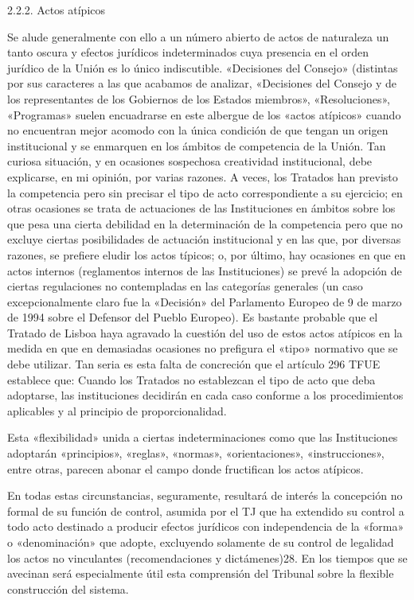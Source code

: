 \documentclass[10pt,a4paper]{article}
\begin{document}
2.2.2. Actos atípicos

Se alude generalmente con ello a un número abierto de actos de naturaleza un tanto oscura y efectos jurídicos indeterminados cuya presencia en el orden jurídico de la Unión es lo único indiscutible. «Decisiones del Consejo» (distintas por sus caracteres a las que acabamos de analizar, «Decisiones del Consejo y de los representantes de los Gobiernos de los Estados miembros», «Resoluciones», «Programas» suelen encuadrarse en este albergue de los «actos atípicos» cuando no encuentran mejor acomodo con la única condición de que tengan un origen institucional y se enmarquen en los ámbitos de competencia de la Unión. Tan curiosa situación, y en ocasiones sospechosa creatividad institucional, debe explicarse, en mi opinión, por varias razones. A veces, los Tratados han previsto la competencia pero sin precisar el tipo de acto correspondiente a su ejercicio; en otras ocasiones se trata de actuaciones de las Instituciones en ámbitos sobre los que pesa una cierta debilidad en la determinación de la competencia pero que no excluye ciertas posibilidades de actuación institucional y en las que, por diversas razones, se prefiere eludir los actos típicos; o, por último, hay ocasiones en que en actos internos (reglamentos internos de las Instituciones) se prevé la adopción de ciertas regulaciones no contempladas en las categorías generales (un caso excepcionalmente claro fue la «Decisión» del Parlamento Europeo de 9 de marzo de 1994 sobre el Defensor del Pueblo Europeo). Es bastante probable que el Tratado de Lisboa haya agravado la cuestión del uso de estos actos atípicos en la medida en que en demasiadas ocasiones no prefigura el «tipo» normativo que se debe utilizar. Tan seria es esta falta de concreción que el artículo 296 TFUE establece que: Cuando los Tratados no establezcan el tipo de acto que deba adoptarse, las instituciones decidirán en cada caso conforme a los procedimientos aplicables y al principio de proporcionalidad. 

Esta «flexibilidad» unida a ciertas indeterminaciones como que las Instituciones adoptarán «principios», «reglas», «normas», «orientaciones», «instrucciones», entre otras, parecen abonar el campo donde fructifican los actos atípicos. 

En todas estas circunstancias, seguramente, resultará de interés la concepción no formal de su función de control, asumida por el TJ que ha extendido su control a todo acto destinado a producir efectos jurídicos con independencia de la «forma» o «denominación» que adopte, excluyendo solamente de su control de legalidad los actos no vinculantes (recomendaciones y dictámenes)28. En los tiempos que se avecinan será especialmente útil esta comprensión del Tribunal sobre la flexible construcción del sistema.
\end{document}

